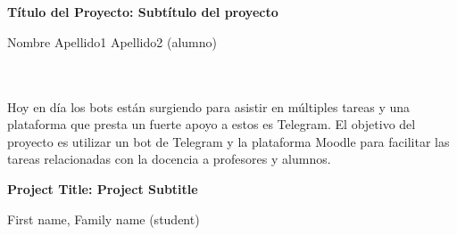 \chapter*{}


%



\cleardoublepage
\thispagestyle{empty}

\begin{center}
{\large\bfseries Título del Proyecto: Subtítulo del proyecto}\\
\end{center}
\begin{center}
Nombre Apellido1 Apellido2 (alumno)\\
\end{center}

\\

\vspace{0.7cm}
\\

Hoy en día los bots están surgiendo para asistir en múltiples tareas y una plataforma que presta un fuerte apoyo a estos es Telegram. El objetivo del proyecto es utilizar un bot de Telegram y la plataforma Moodle para  facilitar las tareas relacionadas con la docencia a  profesores y alumnos.

\cleardoublepage


\thispagestyle{empty}


\begin{center}
{\large\bfseries Project Title: Project Subtitle}\\
\end{center}
\begin{center}
First name, Family name (student)\\
\end{center}

\\

\vspace{0.7cm}
\\


